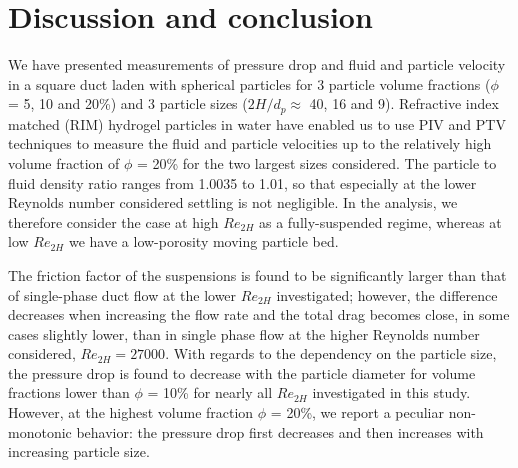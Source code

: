 \documentclass{jfm}
\begin{document}
\section{Discussion and conclusion}

We have presented measurements of pressure drop and fluid and particle velocity in a square duct laden with spherical particles for 3 particle volume fractions ($\phi$ = 5, 10 and 20\%) and 3 particle sizes ($2H/d_p\approx$ 40, 16 and 9).
Refractive index matched (RIM) hydrogel particles in water have enabled us to use PIV and PTV techniques to measure the fluid and particle velocities up to the relatively high volume fraction of $\phi$ = 20\%
for the two largest sizes considered. The particle to fluid density ratio ranges from 1.0035 to 1.01, so that especially at the lower Reynolds number considered settling is not negligible. In the analysis, we therefore consider the case at high $Re_{2H}$ as a fully-suspended regime, whereas at low $Re_{2H}$ we have a low-porosity moving particle bed.

The friction factor of the suspensions is found to be significantly larger than that of single-phase duct flow at the lower $Re_{2H}$ investigated; however, the difference decreases when increasing the flow rate and the total drag becomes close, in some cases slightly lower, than in single phase flow at the higher Reynolds number considered, $Re_{2H}=27000$.
With regards to the dependency on the particle size, the pressure drop is found to decrease with the particle diameter for volume fractions lower than $\phi$ = 10\% for nearly all $Re_{2H}$ investigated in this study. However, at the highest volume fraction $\phi$ = 20\%, we report a peculiar non-monotonic behavior:
the pressure drop first decreases and then increases with increasing particle size. 
\end{document}
